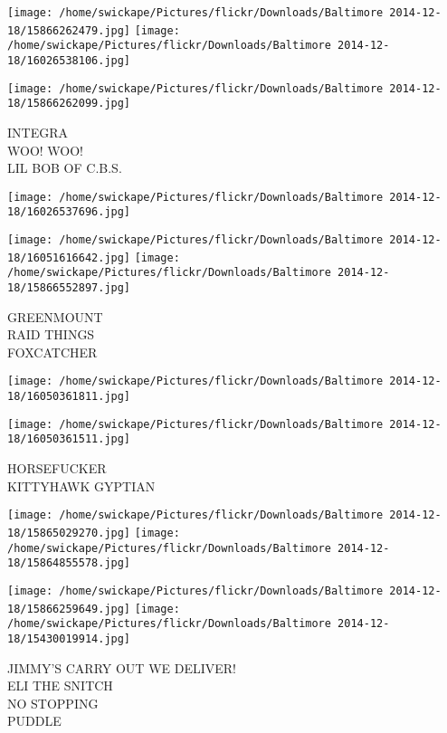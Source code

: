 \documentclass[10pt,letterpaper]{article}
\begin{document}
\texttt{[image: /home/swickape/Pictures/flickr/Downloads/Baltimore 2014-12-18/15866262479.jpg]}
\texttt{[image: /home/swickape/Pictures/flickr/Downloads/Baltimore 2014-12-18/16026538106.jpg]}

\vspace{0.25in}
\texttt{[image: /home/swickape/Pictures/flickr/Downloads/Baltimore 2014-12-18/15866262099.jpg]}

INTEGRA\\
WOO!  WOO!\\
LIL BOB OF C.B.S.\\
\pagebreak

\texttt{[image: /home/swickape/Pictures/flickr/Downloads/Baltimore 2014-12-18/16026537696.jpg]}

\vspace{0.25in}
\texttt{[image: /home/swickape/Pictures/flickr/Downloads/Baltimore 2014-12-18/16051616642.jpg]}
\texttt{[image: /home/swickape/Pictures/flickr/Downloads/Baltimore 2014-12-18/15866552897.jpg]}

GREENMOUNT\\
RAID THINGS\\
FOXCATCHER\\
\pagebreak

\texttt{[image: /home/swickape/Pictures/flickr/Downloads/Baltimore 2014-12-18/16050361811.jpg]}

\vspace{0.25in}
\texttt{[image: /home/swickape/Pictures/flickr/Downloads/Baltimore 2014-12-18/16050361511.jpg]}

HORSEFUCKER\\
KITTYHAWK GYPTIAN\\
\pagebreak

\texttt{[image: /home/swickape/Pictures/flickr/Downloads/Baltimore 2014-12-18/15865029270.jpg]}
\texttt{[image: /home/swickape/Pictures/flickr/Downloads/Baltimore 2014-12-18/15864855578.jpg]}

\texttt{[image: /home/swickape/Pictures/flickr/Downloads/Baltimore 2014-12-18/15866259649.jpg]}
\texttt{[image: /home/swickape/Pictures/flickr/Downloads/Baltimore 2014-12-18/15430019914.jpg]}

JIMMY'S CARRY OUT WE DELIVER!\\
ELI THE SNITCH\\
NO STOPPING\\
PUDDLE\\
\pagebreak
\end{document}
